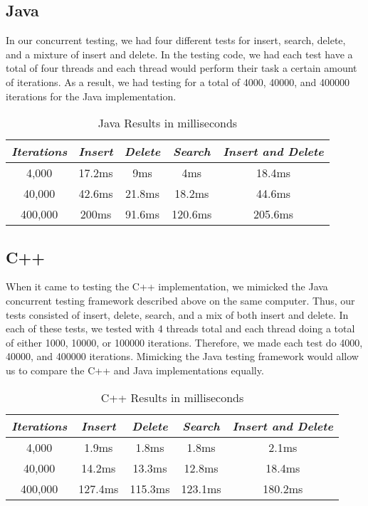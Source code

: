 \documentclass[conference]{IEEEtran}
\begin{document}
\subsection{Java}\label{AA}
In our concurrent testing, we had four different tests for insert, search, delete, and a mixture of insert and delete. In the testing code, we had each test have a total of four threads and each thread would perform their task a certain amount of iterations. As a result, we had testing for a total of 4000, 40000, and 400000 iterations for the Java implementation. 

\begin{table}[htbp]
\caption{Java Results in milliseconds}
\begin{center}
\begin{tabular}{|c|c|c|c|c|}
\hline
\cline{2-6} 
\textbf{\textit{Iterations}}& \textbf{\textit{Insert}}& \textbf{\textit{Delete}}& \textbf{\textit{Search}}& \textbf{\textit{Insert and Delete}}\\
\hline
4,000& 17.2ms& 9ms& 4ms& 18.4ms  \\
\hline
40,000& 42.6ms& 21.8ms& 18.2ms& 44.6ms  \\
\hline
400,000& 200ms& 91.6ms& 120.6ms& 205.6ms \\
\hline
\end{tabular}
\label{tab1}
\end{center}
\end{table}



\subsection{C++}\label{AA}
When it came to testing the C++ implementation, we mimicked the Java concurrent testing framework described above on the same computer. Thus, our tests consisted of insert, delete, search, and a mix of both insert and delete. In each of these tests, we tested with 4 threads total and each thread doing a total of either 1000, 10000, or 100000 iterations. Therefore, we made each test do 4000, 40000, and 400000 iterations. Mimicking the Java testing framework would allow us to compare the C++ and Java implementations equally. 

\begin{table}[htbp]
\caption{C++ Results in milliseconds}
\begin{center}
\begin{tabular}{|c|c|c|c|c|}
\hline
\cline{2-6} 
\textbf{\textit{Iterations}}& \textbf{\textit{Insert}}& \textbf{\textit{Delete}}& \textbf{\textit{Search}}& \textbf{\textit{Insert and Delete}}\\
\hline
4,000& 1.9ms& 1.8ms& 1.8ms& 2.1ms  \\
\hline
40,000& 14.2ms& 13.3ms& 12.8ms& 18.4ms  \\
\hline
400,000& 127.4ms& 115.3ms& 123.1ms& 180.2ms \\
\hline
\end{tabular}
\label{tab1}
\end{center}
\end{table}
\end{document}
